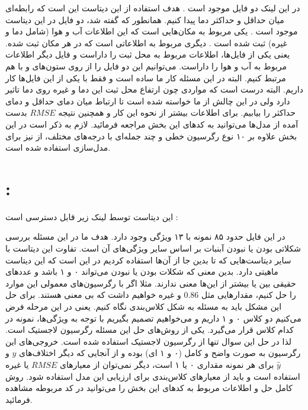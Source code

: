 \documentclass[a4paper, 12pt]{article}
\begin{document}
در این لینک دو فایل موجود است . هدف استفاده از این دیتاست این است که رابطه‌ای میان حداقل و حداکثر دما پیدا کنیم.  همانطور که گفته شد، دو فایل در این دیتاست موجود است . یکی مربوط به مکان‌هایی است که این اطلاعات آب و هوا (شامل دما‌ و غیره) ثبت شده است . دیگری مربوط به اطلاعاتی است که در هر مکان ثبت شده. یعنی یکی از فایل‌ها، اطلاعات مربوط به محل ثبت را داراست و فایل دیگر اطلاعات مربوط به آب و هوا را داراست. می‌توانیم این دو فایل را از روی ستون‌های 
و
با هم مرتبط کنیم. البته در این مسئله کار ما ساده است و فقط با یکی از این فایل‌ها کار داریم. البته درست است که مواردی چون ارتفاع محل ثبت این دما و غیره روی دما تاثیر دارد ولی در این چالش از ما خواسته شده است تا ارتباط میان دمای حداقل و دمای حداکثر را بیابیم.  برای اطلاعات بیشتر از نحوه این کار و همچنین نتیجه 
$RMSE$
بدست آمده از مدل‌ها می‌توانید به کد‌های این بخش مراجعه فرمائید.  لازم به ذکر است در این بخش علاوه بر ۱۰ نوع رگرسیون خطی و چند جمله‌ای با درجه‌های مختلف، از 
نیز برای مدل‌سازی استفاده شده است.

\section{ : }

این دیتاست توسط لینک زیر قابل دسترسی است :
\begin{center}
	\href{https://www.kaggle.com/datasets/fivethirtyeight/the-ultimate-halloween-candy-power-ranking}{}
\end{center}
در این فایل حدود ۸۵ نمونه با ۱۳ ویژگی وجود دارد. هدف ما در این مسئله بررسی شکلاتی بودن یا نبودن آبنبات بر اساس سایر ویژگی‌های آن است. تفاوت این دیتاست با سایر دیتاست‌هایی که تا بدین جا از آن‌ها استفاده کردیم در این است که این دیتاست ماهیتی 
دارد. بدین معنی که شکلات بودن یا نبودن می‌تواند ۰ و ۱ باشد و عدد‌های حقیقی بین یا بیشتر از این‌ها معنی ندارند. مثلا اگر با رگرسیون‌های معمولی این موارد را حل کنیم، مقدار‌هایی مثل 
$0.86$
و غیره خواهیم داشت که بی معنی هستند. 
برای حل این مشکل باید به مسئله به شکل کلاس‌بندی نگاه کنیم. یعنی در این مرحله فرض می‌کنیم دو کلاس ۰ و ۱ داریم و می‌خواهیم تصمیم بگیریم با توجه به ویژگی‌ها، نمونه در کدام کلاس قرار می‌گیرد. یکی از روش‌های حل این مسئله رگرسیون لاجستیک است. لذا در حل این سوال تنها از رگرسیون لاجستیک استفاده شده است. خروجی‌های این رگرسیون به صورت واضح و کامل (۰ و ۱ ‌ای) بوده و از آنجایی که دیگر اختلاف‌های 
$y$
و
$\hat{y}$
برای هر نمونه مقداری ۰ یا ۱ است، دیگر نمی‌توان از معیار‌های  
$RMSE$
یا غیره استفاده است و باید از معیار‌های کلاس‌بندی برای ارزیابی این مدل استفاده شود. روش کامل حل و اطلاعات مربوط به کد‌های این بخش را می‌توانید در کد مربوطه مشاهده فرمائید. 
\end{document}
